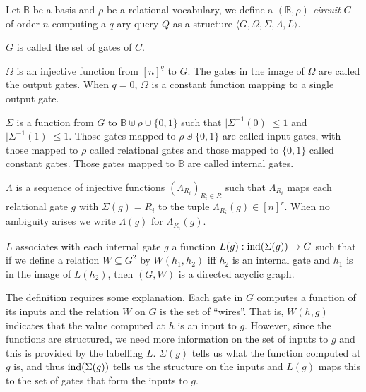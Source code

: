 \documentclass[../paper.tex]{subfiles}
\begin{document}
\begin{definition}
  Let $\mathbb{B}$ be a basis and $\rho$ be a relational vocabulary, we define a
  \emph{$(\mathbb{B}, \rho)$-circuit} $C$ of order $n$ computing a $q$-ary query
  $Q$ as a structure $\langle G, \Omega, \Sigma, \Lambda, L \rangle$.
  \begin{myitemize}
    \setlength\itemsep{0mm}
  \item $G$ is called the set of gates of
    $C$.%
  \item $\Omega$ is an injective function from $[n]^q$ to $G$. The gates in the
    image of $\Omega$ are called the output gates. When $q = 0$, $\Omega$ is a
    constant function mapping to a single output gate.
  \item $\Sigma$ is a function from $G$ to $\mathbb{B} \uplus \rho \uplus
    \{0,1\} $ such that $\vert \Sigma^{-1} (0) \vert \leq 1$ and $\vert
    \Sigma^{-1} (1) \vert \leq 1$. Those gates mapped to $\rho \uplus \{0,1\}$
    are called input gates, with those mapped to $\rho$ called relational gates
    and those mapped to $\{0,1\}$ called constant gates. Those gates mapped to
    $\mathbb{B}$ are called internal gates.
  \item $\Lambda$ is a sequence of injective functions $(\Lambda_{R_i})_{R_i \in
      R}$ such that $\Lambda_{R_i}$ maps each relational gate $g$ with $\Sigma
    (g) = R_i$ to the tuple $\Lambda_{R_i} (g) \in [n]^{r}$. When no ambiguity
    arises we write $\Lambda (g)$ for $\Lambda_{R_i} (g)$.
  \item $L$ associates with each internal gate $g$ a function $L(g):
    \text{\upshape ind}(\Sigma(g)) \rightarrow G$ such that if we define a relation $W
    \subseteq G^{2}$ by $W(h_1,h_2)$ iff $h_2$ is an internal gate and $h_1$ is
    in the image of $L(h_2)$, then $(G, W)$ is a directed acyclic graph.
  \end{myitemize}
\end{definition}

The definition requires some explanation. Each gate in $G$ computes a function
of its inputs and the relation $W$ on $G$ is the set of ``wires''. That is,
$W(h,g)$ indicates that the value computed at $h$ is an input to $g$. However,
since the functions are structured, we need more information on the set of
inputs to $g$ and this is provided by the labelling $L$. $\Sigma(g)$ tells us
what the function computed at $g$ is, and thus $\text{\upshape ind}(\Sigma(g))$ tells us the
structure on the inputs and $L(g)$ maps this to the set of gates that form the
inputs to $g$.
\end{document}
